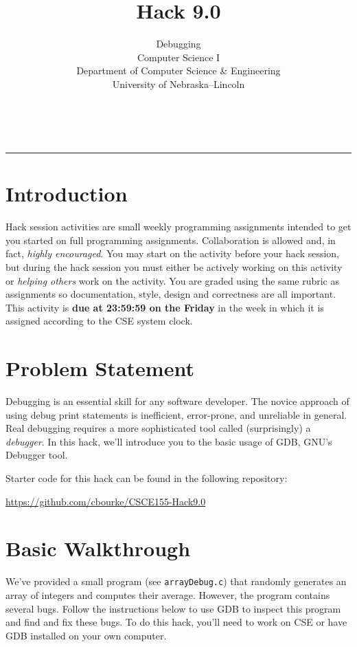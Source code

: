 \documentclass[12pt]{scrartcl}
\title{Hack 9.0}\let\Title\@title
\subtitle{Debugging \\
Computer Science I\\
{\small
\vskip1cm
Department of Computer Science \& Engineering \\
University of Nebraska--Lincoln}
\vskip-1cm}
\date{~}
\begin{document}
\maketitle

\hrule

\section*{Introduction}

Hack session activities are small weekly programming assignments intended
to get you started on full programming assignments.  Collaboration is allowed
and, in fact, \emph{highly encouraged}.  You may start on the activity before
your hack session, but during the hack session you must either be actively 
working on this activity or \emph{helping others} work on the activity.
You are graded using the same rubric as assignments so documentation, style, 
design and correctness are all important.  This activity is \textbf{due 
at 23:59:59 on the Friday} in the week in which it is assigned according 
to the CSE system clock.

\section*{Problem Statement}

Debugging is an essential skill for any software developer.  The novice
approach of using debug print statements is inefficient, error-prone, and
unreliable in general.  Real debugging requires a more sophisticated tool
called (surprisingly) a \emph{debugger}.  In this hack, we'll introduce you
to the basic usage of GDB, GNU's Debugger tool.

Starter code for this hack can be found in the following repository:

\url{https://github.com/cbourke/CSCE155-Hack9.0}

\section*{Basic Walkthrough}

We've provided a small program (see \texttt{arrayDebug.c}) 
that randomly generates an array of integers
and computes their average.  However, the program contains several bugs.
Follow the instructions below to use GDB to inspect this program and find
and fix these bugs.  To do this hack, you'll need to work on CSE or have 
GDB installed on your own computer.
\end{document}
